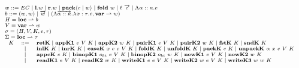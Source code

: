 \documentclass[fleqn]{article}
\begin{document}
\[
\scriptsize
\begin{array}{l}
	w ::= EC \mid \mathbf{l}.w \mid \mathbf{r}.w \mid \mathbf{pack} \langle c \mid w \rangle \mid \mathbf{fold}~w \mid \ell~\overrightarrow{c} \mid \Lambda \alpha :: \kappa. e \\
	b ::= (w,w) \mid \overrightarrow{w} \mid (\Lambda \overrightarrow{\alpha::\kappa}. \lambda x:\tau. e, \mathbf{var} \rightharpoonup w) \\
	H = \mathbf{loc} \rightharpoonup b \\
	V = \mathbf{var} \rightharpoonup w \\
	\sigma = (H, V, K, e, r) \\
	\Sigma = \mathbf{loc} \rightharpoonup \tau \\
	\begin{array}{rcl}
		K & ::= & \mathbf{retK} \mid \mathbf{appK1}~e~V~K \mid \mathbf{appK2}~w~K \mid \mathbf{pairK1}~e~V~K \mid \mathbf{pairK2}~w~K \mid \mathbf{fstK}~K \mid \mathbf{sndK}~K \\
		& \mid & \mathbf{inlK}~K \mid \mathbf{inrK}~K \mid \mathbf{caseK}~x~e~e~V~K \mid \mathbf{foldK}~K \mid \mathbf{unfoldK}~K \mid \mathbf{packK}~c~K \mid \mathbf{unpackK}~\alpha~x~e~V~K \\
		& \mid & \mathbf{appcK}~c~K \mid \mathbf{binopK1}~o_{bt}~e~V~K \mid \mathbf{binopK2}~o_{bt}~w~K \mid \mathbf{newK1}~e~V~K \mid \mathbf{newK2}~w~K \\
		& \mid & \mathbf{readK1}~e~V~K \mid \mathbf{readK2}~w~K \mid \mathbf{writeK1}~e~e~V~K \mid \mathbf{writeK2}~w~e~V~K \mid \mathbf{writeK3}~w~w~K
	\end{array} \\
\end{array}
\]
\end{document}
